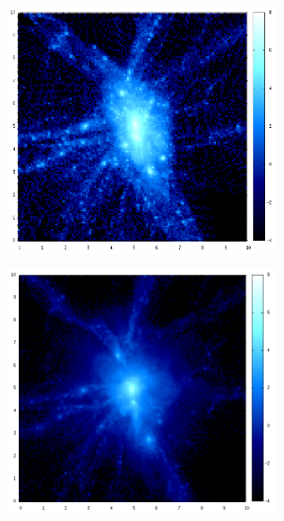 \documentclass[journal]{IEEEtran}
\begin{document}
\begin{figure}[h!]
\begin{subfigure}[t]{0.25\textwidth}
	\end{subfigure}
	\\
	\begin{subfigure}[t]{0.25\textwidth}
		\centering
		\includegraphics[width=\linewidth]{DM04-05.png}
	\end{subfigure}
	\quad
	\begin{subfigure}[t]{0.25\textwidth}
		\centering
		\includegraphics[width=\linewidth]{GAS04-05.png}

\end{subfigure}
\end{figure}
\end{document}
